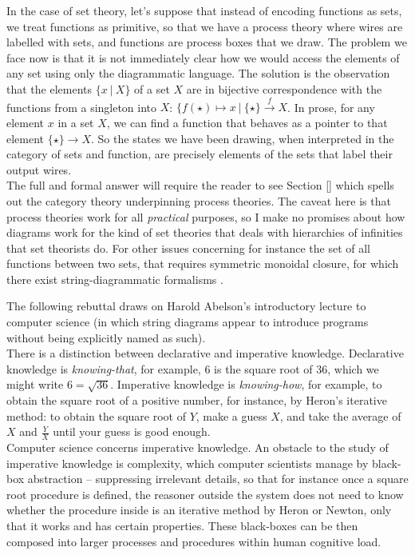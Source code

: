 In the case of set theory, let's suppose that instead of encoding functions as sets, we treat functions as primitive, so that we have a process theory where wires are labelled with sets, and functions are process boxes that we draw. The problem we face now is that it is not immediately clear how we would access the elements of any set using only the diagrammatic language. The solution is the observation that the elements $\{x \ | \ X\}$ of a set $X$ are in bijective correspondence with the functions from a singleton into $X$: $\{ f(\star) \mapsto x \ | \ \{\star\} \overset{f}{\rightarrow} X $. In prose, for any element $x$ in a set $X$, we can find a function that behaves as a pointer to that element $\{\star\} \rightarrow X$. So the states we have been drawing, when interpreted in the category of sets and function, are precisely elements of the sets that label their output wires.\\

The full and formal answer will require the reader to see Section \ref{} which spells out the category theory underpinning process theories. The caveat here is that process theories work for all \emph{practical} purposes, so I make no promises about how diagrams work for the kind of set theories that deals with hierarchies of infinities that set theorists do. For other issues concerning for instance the set of all functions between two sets, that requires symmetric monoidal closure, for which there exist string-diagrammatic formalisms \citep{}.


The following rebuttal draws on Harold Abelson's introductory lecture to computer science \citep{} (in which string diagrams appear to introduce programs without being explicitly named as such).\\

There is a distinction between declarative and imperative knowledge. Declarative knowledge is \emph{knowing-that}, for example, 6 is the square root of 36, which we might write $6 = \sqrt{36}$. Imperative knowledge is \emph{knowing-how}, for example, to obtain the square root of a positive number, for instance, by Heron's iterative method: to obtain the square root of $Y$, make a guess $X$, and take the average of $X$ and $\frac{Y}{X}$ until your guess is good enough.\\

Computer science concerns imperative knowledge. An obstacle to the study of imperative knowledge is complexity, which computer scientists manage by black-box abstraction -- suppressing irrelevant details, so that for instance once a square root procedure is defined, the reasoner outside the system does not need to know whether the procedure inside is an iterative method by Heron or Newton, only that it works and has certain properties. These black-boxes can be then composed into larger processes and procedures within human cognitive load.\\

